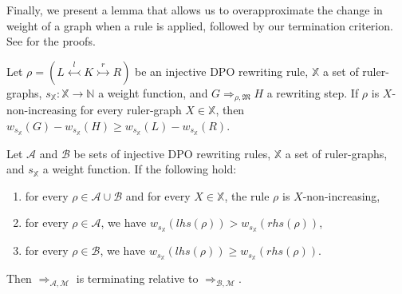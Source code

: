 Finally, we present a lemma that allows us to overapproximate the change in weight of a graph when a rule is applied, followed by our termination criterion. See \cite[Lemma 41, 42]{qiu2025termination} for the proofs.

\begin{lemma}
    \label{lem:w_g_geq_w_h_leq}
    Let $\rho = (L \overset{l}{\leftarrowtail} K \overset{r}{\rightarrowtail} R)$ be an injective DPO rewriting rule,
    \( \mathbb{X} \) a set of ruler-graphs,
    \( s_{\mathbb{X}} \colon \mathbb{X} \to \mathbb{N} \) a weight function,
    and \( G \Rightarrow_{\rho,\mathfrak{M}} H \) a rewriting step. 
    If $\rho$ is \( X \)-non-increasing for every ruler-graph \( X \in \mathbb{X} \), then $
        w_{s_\mathbb{X}}(G) - w_{s_\mathbb{X}}(H) 
        \geq 
        w_{s_\mathbb{X}}(L) - w_{s_\mathbb{X}}(R)
    $.
\end{lemma}
\begin{theorem}[Termination] 
    \label{thm:termination_grs}
    Let \(\mathcal{A}\) and \(\mathcal{B}\) be sets of injective DPO rewriting rules, $\mathbb{X}$ a set of ruler-graphs, and $s_\mathbb{X}$ a weight function. If the following hold:
    \begin{enumerate}
        \item  for every $\rho \in \mathcal{A} \cup \mathcal{B}$ and for every $X \in \mathbb{X}$, the rule $\rho$ is $X$-non-increasing,
        \item for every \(\rho \in \mathcal{A}\), we have \( w_{s_\mathbb{X}}(lhs(\rho)) > w_{s_\mathbb{X}}(rhs(\rho)) \),
        \item for every \(\rho \in \mathcal{B}\), we have \( w_{s_\mathbb{X}}(lhs(\rho)) \geq w_{s_\mathbb{X}}(rhs(\rho)) \).
    \end{enumerate}
    Then \(\Rightarrow_{\mathcal{A},\mathcal{M}}\) is terminating relative to \(\Rightarrow_{\mathcal{B},\mathcal{M}}\).
\end{theorem}